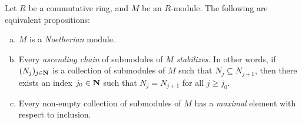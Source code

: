 \begin{proposition}
    \label{prop:equiv-conditions-noetherian}
    Let \(R\) be a commutative ring, and \(M\) be an \(R\)-module. The following are
    equivalent propositions:
    \begin{enumerate}[(a)]\setlength\itemsep{0em}
        \item \(M\) is a \emph{Noetherian} module.

        \item Every \emph{ascending chain} of submodules of \(M\) \emph{stabilizes}. In
              other words, if \((N_j)_{j \in \mathbf{N}}\) is a collection of submodules of \(M\)
              such that \(N_j \subseteq N_{j+1}\), then there exists an index \(j_0 \in \mathbf{N}\)
              such that \(N_j = N_{j+1}\) for all \(j \geq j_0\).

        \item Every non-empty collection of submodules of \(M\) has a \emph{maximal}
              element with respect to inclusion.
    \end{enumerate}
\end{proposition}

